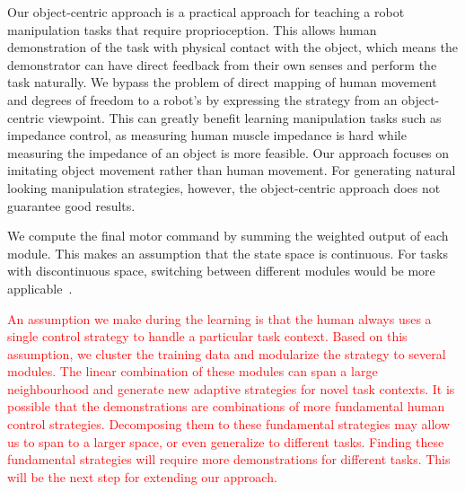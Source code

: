 
Our object-centric approach is a practical approach for teaching a
robot manipulation tasks that require proprioception. This allows
human demonstration of the task with physical contact with the object,
which means the demonstrator can have direct feedback from their own
senses and perform the task naturally. We bypass the problem of direct
mapping of human movement and degrees of freedom to a robot's by
expressing the strategy from an object-centric viewpoint. This can
greatly benefit learning manipulation tasks such as impedance control, as measuring human muscle impedance is hard while measuring the
impedance of an object is more feasible. Our approach focuses on imitating object movement rather than human movement. For generating natural looking manipulation strategies, however, the object-centric approach does not guarantee good results.

We compute the final motor command by summing the weighted output of
each module. This makes an assumption that the state space is
continuous. For tasks with discontinuous space, switching between different modules would be more applicable~\citep{narendra1995adaptation,nakanishi2013spatio}.

\textcolor{red}{An assumption we make during the learning is that the
  human always uses a single control strategy to handle a particular
  task context. Based on this assumption, we cluster the training data
  and modularize the strategy to several modules. The
  linear combination of these modules can span a large neighbourhood
  and generate new adaptive strategies for novel task contexts. It is
  possible that the demonstrations are combinations of more
  fundamental human control strategies. Decomposing them to these
  fundamental strategies may allow us to span to a larger space, or even
  generalize to different tasks. Finding these fundamental strategies
  will require more demonstrations for different tasks. This will be
  the next step for extending our approach. }

